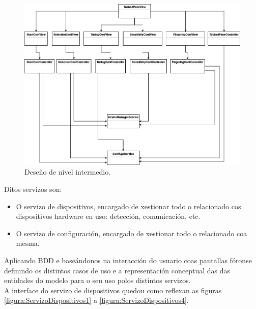    \begin{figure}[htbp]
    \centering
    \includegraphics[scale=0.6, angle=90, keepaspectratio=true]{./imagenes/deseno-ni.png}
    \caption{Deseño de nivel intermedio.}
    \label{figura:DesenoNivelIntermedio}
   \end{figure}
   
   Ditos servizos son:
   
   \begin{itemize}
    \item O servizo de dispositivos, encargado de xestionar todo o relacionado
        cos dispositivos hardware en uso: detección, comunicación, etc.
    \item O servizo de configuración, encargado de xestionar todo o relacionado
        coa mesma.
   \end{itemize}
   
   Aplicando BDD e baseándonos na interacción do usuario coas pantallas fóronse
   definindo os distintos casos de uso e a representación conceptual das
   das entidades do modelo para o seu uso polos distintos servizos. \\
   
   A interface do servizo de dispositivos quedou como reflexan as figuras
   \ref{figura:ServizoDispositivos1} a \ref{figura:ServizoDispositivos4}. \\
   
